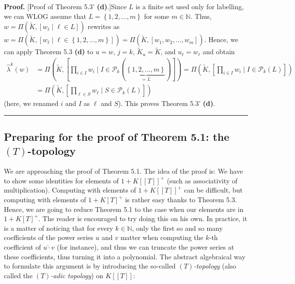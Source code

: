 \documentclass[numbers=enddot,12pt,final,onecolumn,notitlepage]{scrartcl}%
\newenvironment{proof}[1][Proof]{\noindent\textbf{#1.} }{\ \rule{0.5em}{0.5em}}
\begin{document}
\begin{proof}
[Proof of Theorem 5.3' \textbf{(d)}.]Since $L$ is a finite set used only for
labelling, we can WLOG assume that $L=\left\{  1,2,...,m\right\}  $ for some
$m\in\mathbb{N}$. Thus, $w=\Pi\left(  \widetilde{K},\left[  w_{\ell}\mid
\ell\in L\right]  \right)  $ rewrites as $w=\Pi\left(  \widetilde{K},\left[
w_{\ell}\mid\ell\in\left\{  1,2,...,m\right\}  \right]  \right)  =\Pi\left(
\widetilde{K},\left[  w_{1},w_{2},...,w_{m}\right]  \right)  $. Hence, we can
apply Theorem 5.3 \textbf{(d)} to $u=w$, $j=k$, $\widetilde{K}_{u}%
=\widetilde{K}$, and $u_{\ell}=w_{\ell}$ and obtain%
\begin{align*}
\widehat{\lambda}^{k}\left(  w\right)   &  =\Pi\left(  \widetilde{K},\left[
\prod_{i\in I}w_{i}\mid I\in\mathcal{P}_{k}\left(  \underbrace{\left\{
1,2,...,m\right\}  }_{=L}\right)  \right]  \right)  =\Pi\left(  \widetilde{K}%
,\left[  \prod_{i\in I}w_{i}\mid I\in\mathcal{P}_{k}\left(  L\right)  \right]
\right) \\
&  =\Pi\left(  \widetilde{K},\left[  \prod_{\ell\in S}w_{\ell}\mid
S\in\mathcal{P}_{k}\left(  L\right)  \right]  \right)
\end{align*}
(here, we renamed $i$ and $I$ as $\ell$ and $S$). This proves Theorem 5.3'
\textbf{(d)}.
\end{proof}

\subsection{Preparing for the proof of Theorem 5.1: the $\left(  T\right)
$-topology}

We are approaching the proof of Theorem 5.1. The idea of the proof is: We have
to show some identities for elements of $1+K\left[  \left[  T\right]  \right]
^{+}$ (such as associativity of multiplication). Computing with elements of
$1+K\left[  \left[  T\right]  \right]  ^{+}$ can be difficult, but computing
with elements of $1+K\left[  T\right]  ^{+}$ is rather easy thanks to Theorem
5.3. Hence, we are going to reduce Theorem 5.1 to the case when our elements
are in $1+K\left[  T\right]  ^{+}$. The reader is encouraged to try doing this
on his own. In practice, it is a matter of noticing that for every
$k\in\mathbb{N}$, only the first so and so many coefficients of the power
series $u$ and $v$ matter when computing the $k$-th coefficient of
$u\widehat{\cdot}v$ (for instance), and thus we can truncate the power series
at these coefficients, thus turning it into a polynomial. The abstract
algebraical way to formulate this argument is by introducing the so-called
$\left(  T\right)  $\textit{-topology} (also called the $\left(  T\right)
$\textit{-adic topology}) on $K\left[  \left[  T\right]  \right]  $:
\end{document}
